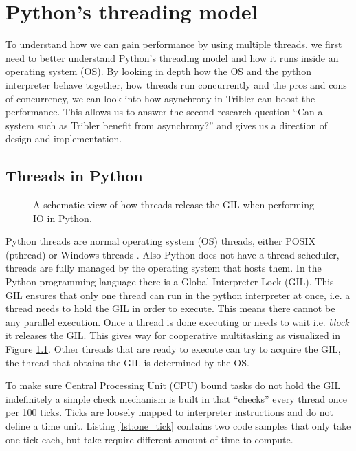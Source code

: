 \chapter{Python's threading model}
\label{cpt:pythons_thread_model}

To understand how we can gain performance by using multiple threads, we first need to better understand Python's threading model and how it runs inside an operating system (OS).
By looking in depth how the OS and the python interpreter behave together, how threads run concurrently and the pros and cons of concurrency, we can look into how asynchrony in Tribler can boost the performance.
This allows us to answer the second research question \enquote{Can a system such as Tribler benefit from asynchrony?} and gives us a direction of design and implementation.

\section{Threads in Python}

\begin{figure}[!h]
	\caption{A schematic view of how threads release the GIL when performing IO in Python.}
	\label{fig:python_threads_release_gil}
\end{figure}

Python threads are normal operating system (OS) threads, either POSIX (pthread) or Windows threads \cite{beazley2010understanding, beazley2009inside}.
Also Python does not have a thread scheduler, threads are fully managed by the operating system that hosts them.
In the Python programming language there is a Global Interpreter Lock (GIL).
This GIL ensures that only one thread can run in the python interpreter at once, i.e. a thread needs to hold the GIL in order to execute.
This means there cannot be any parallel execution.
Once a thread is done executing or needs to wait i.e. \emph{block} it releases the GIL.
This gives way for cooperative multitasking as visualized in Figure \ref{fig:python_threads_release_gil}.
Other threads that are ready to execute can try to acquire the GIL, the thread that obtains the GIL is determined by the OS.

To make sure Central Processing Unit (CPU) bound tasks do not hold the GIL indefinitely a simple check mechanism is built in that \enquote{checks} every thread once per 100 ticks.
Ticks are loosely mapped to interpreter instructions and do not define a time unit.
Listing \ref{lst:one_tick} contains two code samples that only take one tick each, but take require different amount of time to compute.

